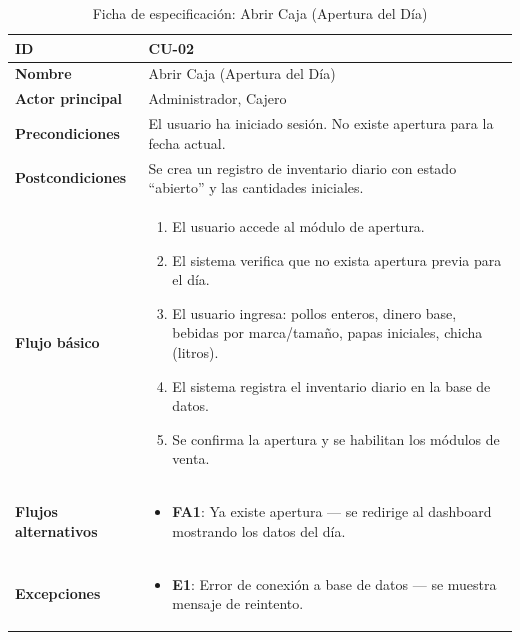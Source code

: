 \documentclass[12pt, a4paper]{article}
\begin{document}
\begin{table}[H]
\centering
\caption{Ficha de especificación: Abrir Caja (Apertura del Día)}
\begin{tabularx}{\textwidth}{|l|X|}
    \hline
    \textbf{ID} & CU-02 \\ \hline
    \textbf{Nombre} & Abrir Caja (Apertura del Día) \\ \hline
    \textbf{Actor principal} & Administrador, Cajero \\ \hline
    \textbf{Precondiciones} & El usuario ha iniciado sesión. No existe apertura para la fecha actual. \\ \hline
    \textbf{Postcondiciones} & Se crea un registro de inventario diario con estado ``abierto'' y las cantidades iniciales. \\ \hline
    \textbf{Flujo básico} &
    \begin{enumerate}[nosep, leftmargin=*]
        \item El usuario accede al módulo de apertura.
        \item El sistema verifica que no exista apertura previa para el día.
        \item El usuario ingresa: pollos enteros, dinero base, bebidas por marca/tamaño, papas iniciales, chicha (litros).
        \item El sistema registra el inventario diario en la base de datos.
        \item Se confirma la apertura y se habilitan los módulos de venta.
    \end{enumerate} \\ \hline
    \textbf{Flujos alternativos} &
    \begin{itemize}[nosep, leftmargin=*]
        \item \textbf{FA1}: Ya existe apertura --- se redirige al dashboard mostrando los datos del día.
    \end{itemize} \\ \hline
    \textbf{Excepciones} &
    \begin{itemize}[nosep, leftmargin=*]
        \item \textbf{E1}: Error de conexión a base de datos --- se muestra mensaje de reintento.
    \end{itemize} \\ \hline
\end{tabularx}
\end{table}
\end{document}
